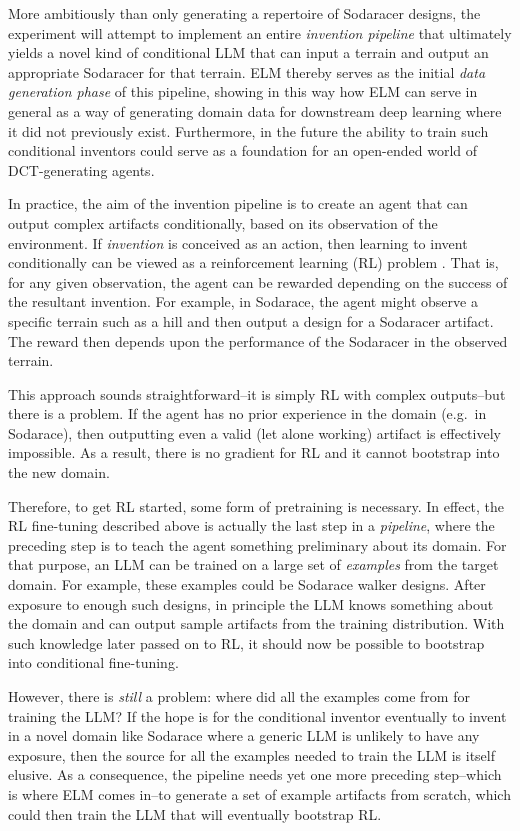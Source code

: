 \documentclass{article}
\begin{document}
More ambitiously than only generating a repertoire of Sodaracer designs, the experiment will attempt to implement an entire \emph{invention pipeline} that ultimately yields a novel kind of conditional LLM that can input a terrain and output an appropriate Sodaracer for that terrain.  ELM thereby serves as the initial \emph{data generation phase} of this pipeline, showing in this way how ELM can serve in general as a way of generating domain data for downstream deep learning where it did not previously exist.  Furthermore, in the future the ability to train such conditional inventors could serve as a foundation for an open-ended world of DCT-generating agents. 

In practice, the aim of the invention pipeline is to create an agent that can output complex artifacts conditionally, based on its observation of the environment.
If \emph{invention} is conceived as an action, then learning to invent conditionally can be viewed as a reinforcement learning (RL) problem
\cite{sutton:rlearn98}.  That is, for any given observation, the agent can be rewarded depending on the success of the resultant invention.  For example, in Sodarace, the agent might observe a specific terrain such as a hill and then output a design for a Sodaracer artifact.  The reward then depends upon the performance of the Sodaracer in the observed terrain.

This approach sounds straightforward--it is simply RL with complex outputs--but there is a problem.  If the agent has no prior experience in the domain (e.g.\ in Sodarace), then outputting even a valid (let alone working) artifact is effectively impossible.  As a result, there is no gradient for RL and it cannot bootstrap into the new domain.  

Therefore, to get RL started, some form of pretraining is necessary.  In effect, the RL fine-tuning described above is actually the last step in a \emph{pipeline}, where the preceding step is to teach the agent something preliminary about its domain.  For that purpose, an LLM can be trained on a large set of \emph{examples} from the target domain.  For example, these examples could be Sodarace walker designs.  After exposure to enough such designs, in principle the LLM knows something about the domain and can output sample artifacts from the training distribution.  With such knowledge later passed on to RL, it should now be possible to bootstrap into conditional fine-tuning.

However, there is \emph{still} a problem: where did all the examples come from for training the LLM?  If the hope is for the conditional inventor eventually to invent in a novel domain like Sodarace where a generic LLM  is unlikely to have any exposure, then the source for all the examples needed to train the LLM is itself elusive.  As a consequence, the pipeline needs yet one more preceding step--which is where ELM comes in--to generate a set of example artifacts from scratch, which could then train the LLM that will eventually bootstrap RL.
\end{document}
